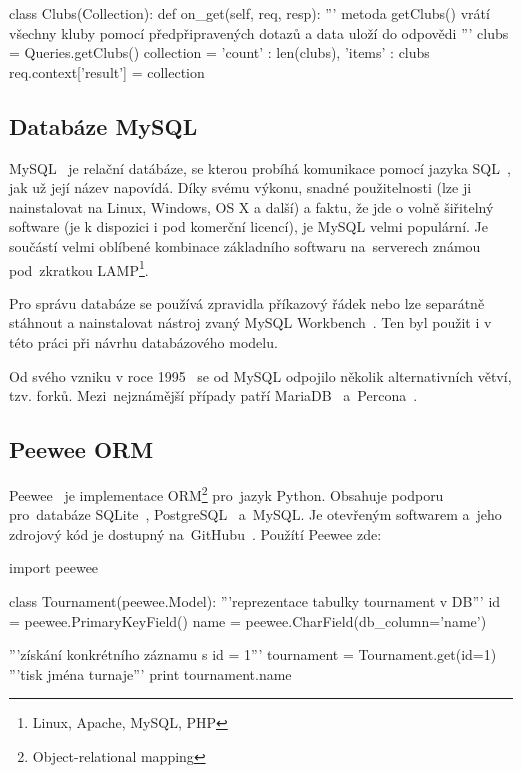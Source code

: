 \begin{python}
class Clubs(Collection):
    def on_get(self, req, resp):
        '''
        metoda getClubs() vrátí všechny kluby
        pomocí předpřipravených dotazů a data
        uloží do odpovědi
        '''
        clubs = Queries.getClubs()
        collection = {
            'count' : len(clubs),
            'items' : clubs
        }
        req.context['result'] = collection
\end{python}

\subsection{Databáze MySQL}

MySQL~\cite{mysql} je relační datábáze, se kterou probíhá komunikace pomocí jazyka SQL~\cite{sql}, jak už její název napovídá.
Díky svému výkonu, snadné použitelnosti (lze ji nainstalovat na Linux, Windows, OS X a další) a faktu,
že jde o volně šiřitelný software (je k dispozici i pod komerční licencí),
je MySQL velmi populární. Je součástí velmi oblíbené kombinace
základního softwaru na~serverech známou pod~zkratkou LAMP\footnote{Linux, Apache, MySQL, PHP}.

Pro správu databáze se používá zpravidla příkazový řádek nebo lze separátně stáhnout
a nainstalovat nástroj zvaný MySQL Workbench~\cite{workbench}. Ten byl použit i v této práci při návrhu databázového modelu.

Od svého vzniku v roce 1995~\cite{mysql_history} se od MySQL odpojilo několik alternativních větví, tzv. forků.
Mezi~nejznámější případy patří MariaDB~\cite{mariadb} a~Percona~\cite{percona}.

\subsection{Peewee ORM}

Peewee~\cite{peewee} je implementace ORM\footnote{Object-relational mapping} pro~jazyk Python.
Obsahuje podporu pro~databáze SQLite~\cite{sqllite}, PostgreSQL~\cite{postgresql} a~MySQL.
Je otevřeným softwarem a~jeho zdrojový kód je dostupný na~GitHubu~\cite{github}. Použítí Peewee zde: 

\begin{python}
import peewee

class Tournament(peewee.Model):
   '''reprezentace tabulky tournament v DB'''
   id = peewee.PrimaryKeyField()
   name = peewee.CharField(db_column='name')

'''získání konkrétního záznamu s id = 1'''
tournament = Tournament.get(id=1)
'''tisk jména turnaje'''
print tournament.name
\end{python}

